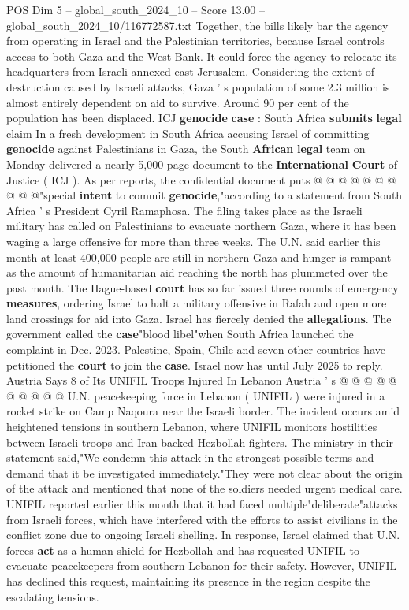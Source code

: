 \begin{textsample}{POS Dim 5 – global\_south\_2024\_10 – Score 13.00 – global\_south\_2024\_10/116772587.txt}
Together, the bills likely bar the agency from operating in Israel and the Palestinian territories, because Israel controls access to both Gaza and the West Bank.
It could force the agency to relocate its headquarters from Israeli-annexed east Jerusalem.
Considering the extent of destruction caused by Israeli attacks, Gaza ' s population of some 2.3 million is almost entirely dependent on aid to survive.
Around 90 per cent of the population has been displaced.
ICJ \textbf{genocide} \textbf{case} : South Africa \textbf{submits} \textbf{legal} claim In a fresh development in South Africa accusing Israel of committing \textbf{genocide} against Palestinians in Gaza, the South \textbf{African} \textbf{legal} team on Monday delivered a nearly 5,000-page document to the \textbf{International} \textbf{Court} of Justice ( ICJ ).
As per reports, the confidential document puts @ @ @ @ @ @ @ @ @ @"special \textbf{intent} to commit \textbf{genocide},"according to a statement from South Africa ' s President Cyril Ramaphosa.
The filing takes place as the Israeli military has called on Palestinians to evacuate northern Gaza, where it has been waging a large offensive for more than three weeks.
The U.N. said earlier this month at least 400,000 people are still in northern Gaza and hunger is rampant as the amount of humanitarian aid reaching the north has plummeted over the past month.
The Hague-based \textbf{court} has so far issued three rounds of emergency \textbf{measures}, ordering Israel to halt a military offensive in Rafah and open more land crossings for aid into Gaza.
Israel has fiercely denied the \textbf{allegations}.
The government called the \textbf{case}"blood libel"when South Africa launched the complaint in Dec. 2023.
Palestine, Spain, Chile and seven other countries have petitioned the \textbf{court} to join the \textbf{case}.
Israel now has until July 2025 to reply.
Austria Says 8 of Its UNIFIL Troops Injured In Lebanon Austria ' s @ @ @ @ @ @ @ @ @ @ U.N. peacekeeping force in Lebanon ( UNIFIL ) were injured in a rocket strike on Camp Naqoura near the Israeli border.
The incident occurs amid heightened tensions in southern Lebanon, where UNIFIL monitors hostilities between Israeli troops and Iran-backed Hezbollah fighters.
The ministry in their statement said,"We condemn this attack in the strongest possible terms and demand that it be investigated immediately."They were not clear about the origin of the attack and mentioned that none of the soldiers needed urgent medical care.
UNIFIL reported earlier this month that it had faced multiple"deliberate"attacks from Israeli forces, which have interfered with the efforts to assist civilians in the conflict zone due to ongoing Israeli shelling.
In response, Israel claimed that U.N. forces \textbf{act} as a human shield for Hezbollah and has requested UNIFIL to evacuate peacekeepers from southern Lebanon for their safety.
However, UNIFIL has declined this request, maintaining its presence in the region despite the escalating tensions.

\end{textsample}
